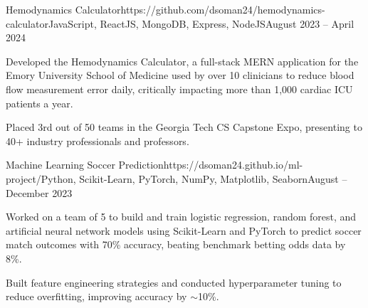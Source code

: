 \documentclass{article}
\begin{document}
\begin{flushleft}

    \vspace{3pt}

    \begin{project}{Hemodynamics Calculator}{https://github.com/dsoman24/hemodynamics-calculator}{JavaScript, ReactJS, MongoDB, Express, NodeJS}{August 2023 -- April 2024}
        \item Developed the Hemodynamics Calculator, a full-stack MERN application for the Emory University School of Medicine used by over 10 clinicians to reduce blood flow measurement error daily, critically impacting more than 1,000 cardiac ICU patients a year.
        \item Placed 3rd out of 50 teams in the Georgia Tech CS Capstone Expo, presenting to 40+ industry professionals and professors.
    \end{project}

    \begin{project}{Machine Learning Soccer Prediction}{https://dsoman24.github.io/ml-project/}{Python, Scikit-Learn, PyTorch, NumPy, Matplotlib, Seaborn}{August -- December 2023}
        \item Worked on a team of 5 to build and train logistic regression, random forest, and artificial neural network models using Scikit-Learn and PyTorch to predict soccer match outcomes with 70\% accuracy, beating benchmark betting odds data by 8\%.
        \item Built feature engineering strategies and conducted hyperparameter tuning to reduce overfitting, improving accuracy by $\sim$10\%.
    \end{project}


    \vspace{3pt}
     \\
     \\
     \\
     \\

\end{flushleft}
\end{document}

